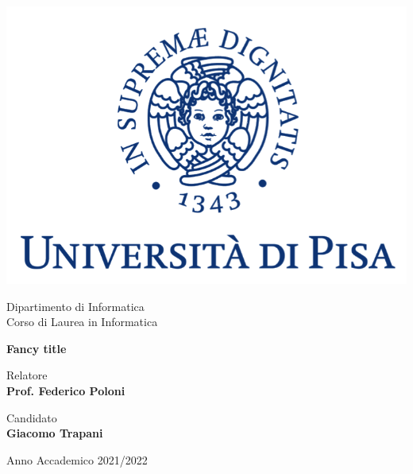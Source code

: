 \documentclass[12pt]{report}
\theoremstyle{definition}
\theoremstyle{definition}
\begin{document}
\begin{titlepage}
    \clearpage\thispagestyle{empty}
    \centering
    \vspace{1cm}

    \includegraphics[scale=0.60]{images/unipi-logo.png}

    {\normalsize \noindent Dipartimento di Informatica \\
            Corso di Laurea in Informatica \par}
    
    \vspace{2cm}
    {\huge \textbf{Fancy title} \par }

    \vspace{3cm}

    \begin{minipage}[t]{0.47\textwidth}
        {\large{Relatore \\ \textbf{Prof. Federico Poloni}}}
    \end{minipage}\hfill\begin{minipage}[t]{0.47\textwidth}\raggedleft
        {\large {Candidato \\ \textbf{Giacomo Trapani}}}
    \end{minipage}

    \vspace{3cm}

    {\normalsize Anno Accademico 2021/2022 \par}

    \pagebreak
\end{titlepage}
\setcounter{chapter}{-1}
\tableofcontents
\pagebreak

\pagebreak

\pagebreak

\pagebreak

\pagebreak

\end{document}
